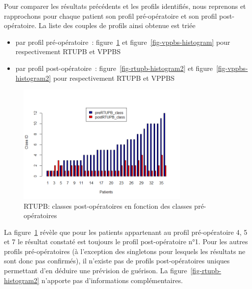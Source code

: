 %

Pour comparer les résultats précédents et les profils identifiés, nous reprenons et rapprochons pour chaque patient son profil pré-opératoire et son profil post-opératoire. La liste des couples de profils ainsi obtenue
est triée
\begin{itemize}
 \item  par profil pré-opératoire~: figure~\ref{fig-rtupb-histogram} et figure~\ref{fig-vppbs-histogram} pour respectivement RTUPB et VPPBS
 \item  par profil post-opératoire~: figure~\ref{fig-rtupb-histogram2} et figure~\ref{fig-vppbs-histogram2} pour respectivement RTUPB et VPPBS
\end{itemize}

\begin{figure}[H]
\centering
\includegraphics[width=0.75\textwidth]{../Fig/RTUPB/rtupb-histogram-pre-post.png}
\caption{RTUPB: classes post-opératoires en fonction des classes pré-opératoires}
\label{fig-rtupb-histogram}
\end{figure}

La figure~\ref{fig-rtupb-histogram} révèle que pour les patients appartenant au profil pré-opératoire 4, 5 et 7 le résultat constaté est toujours le profil post-opératoire n°1.  Pour les autres profils pré-opératoires (à l'exception des singletons pour lesquels les résultats ne sont donc pas confirmés), il n'existe pas de profils post-opératoires uniques permettant d'en déduire une prévision de guérison.
La figure~\ref{fig-rtupb-histogram2} n'apporte pas d'informations complémentaires.

